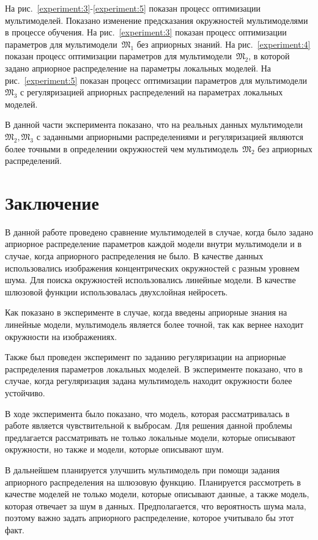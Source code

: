 \documentclass[12pt, twoside]{article}
\numberwithin{equation}{section}
\begin{document}
На рис.~\ref{experiment:3}-\ref{experiment:5} показан процесс оптимизации мультимоделей. Показано изменение предсказания окружностей мультимоделями в процессе обучения. На рис.~\ref{experiment:3} показан процесс оптимизации параметров для мультимодели~$\mathfrak{M}_1$ без априорных знаний. На рис.~\ref{experiment:4} показан процесс оптимизации параметров для мультимодели~$\mathfrak{M}_2$, в которой задано априорное распределение на параметры локальных моделей. На рис.~\ref{experiment:5} показан процесс оптимизации параметров для мультимодели~$\mathfrak{M}_3$ с регуляризацией априорных распределений на параметрах локальных моделей.

В данной части эксперимента показано, что на реальных данных мультимодели~$\mathfrak{M}_2, \mathfrak{M}_3$ с заданными априорными распределениями и регуляризацией являются более точными в определении окружностей чем мультимодель~$\mathfrak{M}_2$ без априорных распределений.


\section{Заключение}
В данной работе проведено сравнение мультимоделей в случае, когда было задано априорное распределение параметров каждой модели внутри мультимодели и в случае, когда априорного распределения не было. В качестве данных использовались изображения концентрических окружностей с разным уровнем шума. Для поиска окружностей использовались линейные модели. В качестве шлюзовой функции использовалась двухслойная нейросеть.

Как показано в эксперименте в случае, когда введены априорные знания на линейные модели, мультимодель является более точной, так как вернее находит окружности на изображениях.

Также был проведен эксперимент по заданию регуляризации на априорные распределения параметров локальных моделей. В эксперименте показано, что в случае, когда регуляризация задана мультимодель находит окружности более устойчиво.

В ходе эксперимента было показано, что модель, которая рассматривалась в работе является чувствительной к выбросам. Для решения данной проблемы предлагается рассматривать не только локальные модели, которые описывают окружности, но также и модели, которые описывают шум. 

В дальнейшем планируется улучшить мультимодель при помощи задания априорного распределения на шлюзовую функцию. Планируется рассмотреть в качестве моделей не только модели, которые описывают данные, а также модель, которая отвечает за шум в данных. Предполагается, что вероятность шума мала, поэтому важно задать априорного распределение, которое учитывало бы этот факт.
\end{document}
